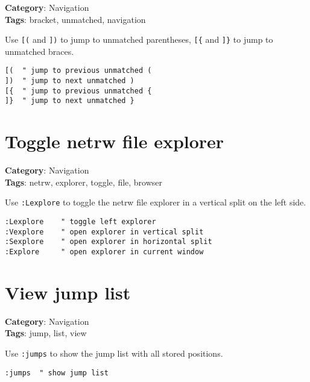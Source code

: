 {{{{{{{{{{\textbf{Category}: Navigation\\ \textbf{Tags}: bracket, unmatched, navigation
\vspace{0.5cm}

Use {\footnotesize \Verb§[(§} and {\footnotesize \Verb§])§} to jump to unmatched parentheses, {\footnotesize \Verb§[{§} and {\footnotesize \Verb§]}§} to jump to unmatched braces.

\begin{Exa*}{}
\begin{Verbatim}[fontsize=\footnotesize, breaklines, breakanywhere]
[(  " jump to previous unmatched (
])  " jump to next unmatched )
[{  " jump to previous unmatched {
]}  " jump to next unmatched }
\end{Verbatim}
\end{Exa*}

\section{Toggle netrw file explorer}

\textbf{Category}: Navigation\\ \textbf{Tags}: netrw, explorer, toggle, file, browser
\vspace{0.5cm}

Use {\footnotesize \Verb§:Lexplore§} to toggle the netrw file explorer in a vertical split on the left side.

\begin{Exa*}{}
\begin{Verbatim}[fontsize=\footnotesize, breaklines, breakanywhere]
:Lexplore    " toggle left explorer
:Vexplore    " open explorer in vertical split
:Sexplore    " open explorer in horizontal split
:Explore     " open explorer in current window
\end{Verbatim}
\end{Exa*}

\section{View jump list}

\textbf{Category}: Navigation\\ \textbf{Tags}: jump, list, view
\vspace{0.5cm}

Use {\footnotesize \Verb§:jumps§} to show the jump list with all stored positions.

\begin{Exa*}{}
\begin{Verbatim}[fontsize=\footnotesize, breaklines, breakanywhere]
:jumps  " show jump list
\end{Verbatim}
\end{Exa*}

}}}}}}}}}}
